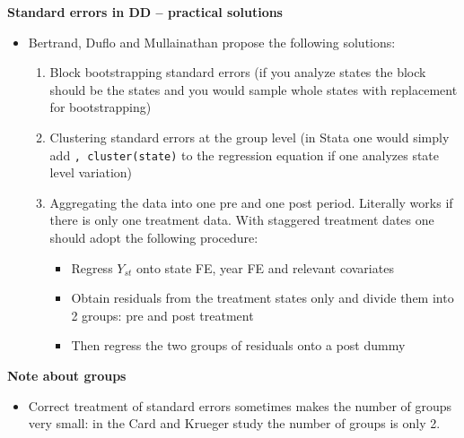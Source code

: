 \documentclass[notes=show]{beamer}
\begin{document}
\begin{frame}[plain]
	\begin{center}
	\textbf{Standard errors in DD -- practical solutions}
	\end{center}
	
	\begin{itemize}
	\item Bertrand, Duflo and Mullainathan propose the following solutions:
		\begin{enumerate}
		\item Block bootstrapping standard errors (if you analyze states the block should be the states and you would sample whole states with replacement for bootstrapping)
		\item Clustering standard errors at the group level (in Stata one would simply add \texttt{, cluster(state)} to the regression equation if one analyzes state level variation)
		\item Aggregating the data into one pre and one post period. Literally works if there is only one treatment data.  With staggered treatment dates one should adopt the following procedure:
			\begin{itemize}
			\item Regress $Y_{st}$ onto state FE, year FE and relevant covariates
			\item Obtain residuals from the treatment states only and divide them into 2 groups: pre and post treatment
			\item Then regress the two groups of residuals onto a post dummy
			\end{itemize}
		\end{enumerate}
	\end{itemize}
\end{frame}

\begin{frame}[plain]

\begin{center}
\textbf{Note about groups}
\end{center}

\begin{itemize}
	\item Correct treatment of standard errors sometimes makes the number of groups very small: in the Card and Krueger study the number of groups is only 2.

\end{itemize}

\end{frame}
	
\end{document}

